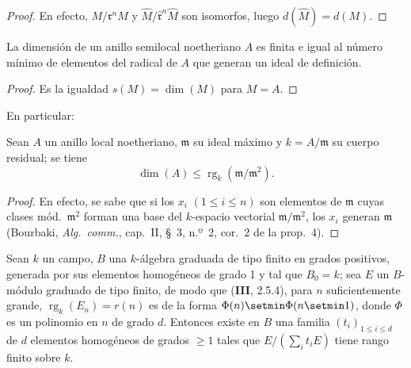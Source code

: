 
\begin{proof}
En efecto, $M/\mathfrak{r}^nM$ y
$\widehat{M}/\widehat{\mathfrak{r}}^n\widehat{M}$ son isomorfos, luego
$d(\widehat{M})=d(M)$.
\end{proof}

\begin{corollary}[16.2.5]
\label{0.16.2.5-es}
La dimensión de un anillo semilocal noetheriano $A$ es finita e igual al número
mínimo de elementos del radical de $A$ que generan un ideal de definición.
\end{corollary}

\begin{proof}
Es la igualdad $s(M)=\dim(M)$ para $M=A$.
\end{proof}

En particular:

\begin{corollary}[16.2.6]
\label{0.16.2.6-es}
Sean $A$ un anillo local noetheriano, $\mathfrak{m}$ su ideal máximo y
$k=A/\mathfrak{m}$ su cuerpo residual; se tiene
\begin{equation}
\label{0.16.2.6.1-es}
\tag{16.2.6.1}
  \dim(A)\leq\operatorname{rg}_k(\mathfrak{m}/\mathfrak{m}^2).
\end{equation}
\end{corollary}

\begin{proof}
En efecto, se sabe que si los $x_i$ $(1\leq i\leq n)$ son elementos de
$\mathfrak{m}$ cuyas clases mód.~$\mathfrak{m}^2$ forman una base del
$k$-espacio vectorial $\mathfrak{m}/\mathfrak{m}^2$, los $x_i$ generan
$\mathfrak{m}$ (Bourbaki, \emph{Alg.~comm.}, cap.~II, \S~3, n.º~2, cor.~2 de
la prop.~4).
\end{proof}

\begin{proposition}[16.2.7]
\label{0.16.2.7-es}
Sean $k$ un campo, $B$ una $k$-álgebra graduada de tipo finito en grados
positivos, generada por sus elementos homogéneos de grado 1 y tal que $B_0=k$;
sea $E$ un $B$-módulo graduado de tipo finito, de modo que \textup{(\textbf{III}, 2.5.4)}, para
$n$ suficientemente grande, $\operatorname{rg}_k(E_n)=r(n)$ es de la forma
$\Phi(n)\setmin\Phi(n\setmin 1)$, donde $\Phi$ es un polinomio en $n$ de grado $d$. Entonces
existe en $B$ una familia $(t_i)_{1\leq i\leq d}$ de $d$ elementos homogéneos
de grados $\geq1$ tales que $E/(\sum_i t_iE)$ tiene rango finito sobre $k$.
\end{proposition}

